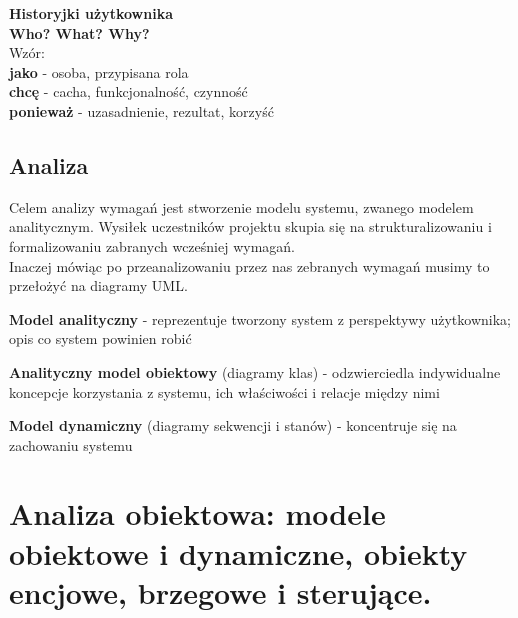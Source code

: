 \documentclass[12pt]{article}
\begin{document}
    \begin{definition}
        \textbf{Historyjki użytkownika} \\

        \textbf{Who? What? Why?} \\

        Wzór: \\

        \textbf{jako} - osoba, przypisana rola \\
        \textbf{chcę} - cacha, funkcjonalność, czynność \\
        \textbf{ponieważ} - uzasadnienie, rezultat, korzyść \\
    \end{definition}

    \subsection{Analiza}

    \begin{definition}
        Celem analizy wymagań jest stworzenie modelu systemu, zwanego modelem analitycznym. Wysiłek uczestników projektu skupia się na strukturalizowaniu i formalizowaniu zabranych wcześniej wymagań. \\
        Inaczej mówiąc po przeanalizowaniu przez nas zebranych wymagań musimy to przełożyć na diagramy UML.
    \end{definition}

    \begin{definition}
        \textbf{Model analityczny} - reprezentuje tworzony system z perspektywy użytkownika; opis co system powinien robić
    \end{definition}

    \begin{definition}
        \textbf{Analityczny model obiektowy} (diagramy klas) - odzwierciedla indywidualne koncepcje korzystania z systemu, ich właściwości i relacje między nimi
    \end{definition}

    \begin{definition}
        \textbf{Model dynamiczny} (diagramy sekwencji i stanów) - koncentruje się na zachowaniu systemu
    \end{definition}

    \newpage

    \section{Analiza obiektowa: modele obiektowe i dynamiczne, obiekty encjowe, brzegowe i sterujące.}
\end{document}
